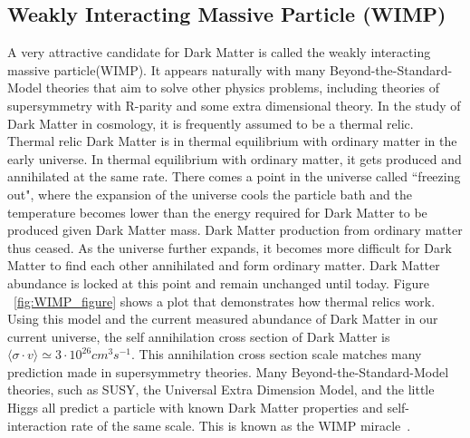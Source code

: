 
\subsection{Weakly Interacting Massive Particle (WIMP)}
A very attractive candidate for Dark Matter is called the weakly interacting massive particle(WIMP). It appears naturally with many Beyond-the-Standard-Model theories that aim to solve other physics problems, including theories of supersymmetry with R-parity and some extra dimensional theory. 
In the study of Dark Matter in cosmology, it is frequently assumed to be a thermal relic. Thermal relic Dark Matter is in thermal equilibrium with ordinary matter in the early universe. In thermal equilibrium with ordinary matter, it gets produced and annihilated at the same rate. There comes a point in the universe called ``freezing out", where the expansion of the universe cools the particle bath and the temperature becomes lower than the energy required for Dark Matter to be produced given
Dark Matter mass. Dark Matter production from ordinary matter thus ceased. As the universe further expands, it becomes more difficult for Dark Matter to find each other annihilated and form ordinary matter. Dark Matter abundance is locked at this point and remain unchanged until today. Figure ~\ref{fig:WIMP_figure} shows a plot that demonstrates how thermal relics work. Using this model and the current measured abundance of Dark Matter in our current universe, the self annihilation cross section of Dark Matter is $ \langle \sigma \cdot v \rangle \simeq 3 \cdot 10^{26}cm^{3} s^{-1}$. This annihilation cross section scale matches many prediction made in supersymmetry theories. Many Beyond-the-Standard-Model theories, such as SUSY, the Universal Extra Dimension Model, and the little Higgs all predict a particle with known Dark Matter properties and self-interaction rate of the same scale. This is known as the WIMP miracle~\cite{Dev_2014}.



